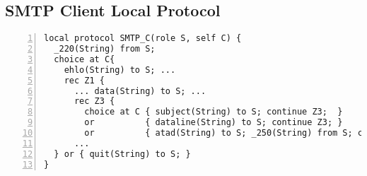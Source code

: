 \subsection{SMTP Client Local Protocol}
	
\label{app:smtp_local}

\begin{lstlisting}[numbers=left]
local protocol SMTP_C(role S, self C) {
  _220(String) from S;
  choice at C{
    ehlo(String) to S; ...
    rec Z1 {
      ... data(String) to S; ...
      rec Z3 {
        choice at C { subject(String) to S; continue Z3;  }
        or          { dataline(String) to S; continue Z3; }
        or          { atad(String) to S; _250(String) from S; continue Z1; }}}
      ...
  } or { quit(String) to S; }
}
\end{lstlisting}
%
